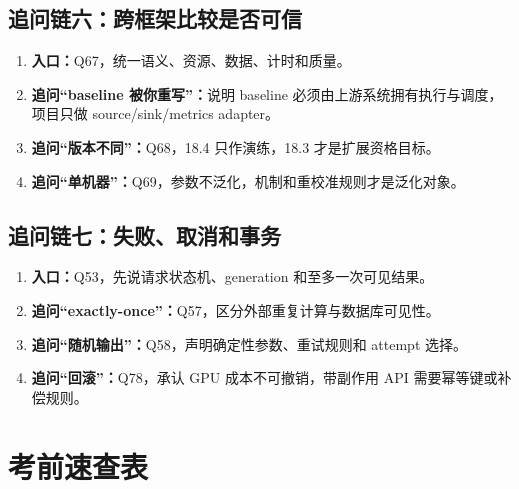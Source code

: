 \documentclass[10pt,a4paper]{ctexart}
\begin{document}
\subsection{追问链六：跨框架比较是否可信}
\begin{enumerate}
  \item \textbf{入口：}Q67，统一语义、资源、数据、计时和质量。
  \item \textbf{追问“baseline 被你重写”：}说明 baseline 必须由上游系统拥有执行与调度，项目只做 source/sink/metrics adapter。
  \item \textbf{追问“版本不同”：}Q68，18.4 只作演练，18.3 才是扩展资格目标。
  \item \textbf{追问“单机器”：}Q69，参数不泛化，机制和重校准规则才是泛化对象。
\end{enumerate}

\subsection{追问链七：失败、取消和事务}
\begin{enumerate}
  \item \textbf{入口：}Q53，先说请求状态机、generation 和至多一次可见结果。
  \item \textbf{追问“exactly-once”：}Q57，区分外部重复计算与数据库可见性。
  \item \textbf{追问“随机输出”：}Q58，声明确定性参数、重试规则和 attempt 选择。
  \item \textbf{追问“回滚”：}Q78，承认 GPU 成本不可撤销，带副作用 API 需要幂等键或补偿规则。
\end{enumerate}

\section{考前速查表}
\end{document}
